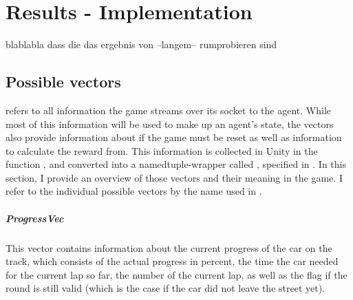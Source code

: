 \chapter{Results - Implementation}

\label{ch:implementationresults}

blablabla dass die das ergebnis von --langem-- rumprobieren sind

\section{Possible vectors}

\label{ch:thevectors}


 refers to all information the game streams over its socket to the agent. While most of this information will be used to make up an agent's state, the vectors also provide information about if the game must be reset as well as information to calculate the reward from. This information is collected in Unity in the function , and converted into a namedtuple-wrapper called , specified in . In this section, I provide an overview of those vectors and their meaning in the game. I refer to the individual possible vectors by the name used in .

\paragraph{ProgressVec} This vector contains information about the current progress of the car on the track, which consists of the actual progress in percent, the time the car needed for the current lap so far, the number of the current lap, as well as the flag if the round is still valid (which is the case if the car did not leave the street yet).

